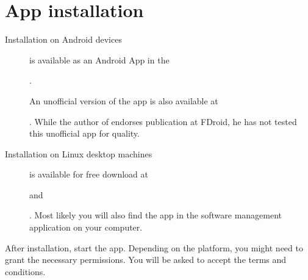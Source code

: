 \documentclass[letterpaper,10pt,english]{sphinxmanual}
\begin{document}
\section{App installation}
\label{\detokenize{01-intro/02-getting_started:app-installation}}\begin{description}
\item[{Installation on Android devices}] \leavevmode
\sphinxAtStartPar
{} is available as an Android App in the %
\begin{footnote}[5]\sphinxAtStartFootnote
{}
%
\end{footnote}.

\sphinxAtStartPar
An unofficial version of the app is also available at %
\begin{footnote}[6]\sphinxAtStartFootnote
{}
%
\end{footnote}.  While the
author of  endorses publication at F\sphinxhyphen{}Droid, he
has not tested this unofficial app for quality.

\item[{Installation on Linux desktop machines}] \leavevmode
\sphinxAtStartPar
{} is available for free download at %
\begin{footnote}[7]\sphinxAtStartFootnote
{}
%
\end{footnote} and
%
\begin{footnote}[8]\sphinxAtStartFootnote
{}
%
\end{footnote}.  Most likely
you will also find the app in the software management application on your
computer.

\end{description}

\sphinxAtStartPar
After installation, start the app.  Depending on the platform, you might need to
grant the necessary permissions.  You will be asked to accept the terms and
conditions.
\end{document}
